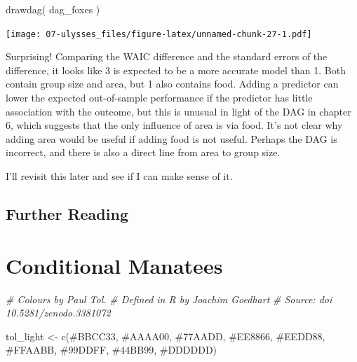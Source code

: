 \documentclass[
]{book}
\newenvironment{Shaded}{\begin{snugshade}}{\end{snugshade}}
\newcommand{\CommentTok}[1]{\textcolor[rgb]{0.56,0.35,0.01}{\textit{#1}}}
\newcommand{\FunctionTok}[1]{\textcolor[rgb]{0.00,0.00,0.00}{#1}}
\newcommand{\NormalTok}[1]{#1}
\newcommand{\OtherTok}[1]{\textcolor[rgb]{0.56,0.35,0.01}{#1}}
\newcommand{\StringTok}[1]{\textcolor[rgb]{0.31,0.60,0.02}{#1}}
\begin{document}
\begin{Shaded}
\begin{Highlighting}[]
\FunctionTok{drawdag}\NormalTok{( dag\_foxes )}
\end{Highlighting}
\end{Shaded}

\texttt{[image: 07-ulysses\_files/figure-latex/unnamed-chunk-27-1.pdf]}

Surprising! Comparing the WAIC difference and the standard errors of the difference, it looks like 3 is expected to be a more accurate model than 1. Both contain group size and area, but 1 also contains food. Adding a predictor can lower the expected out-of-sample performance if the predictor has little association with the outcome, but this is unusual in light of the DAG in chapter 6, which suggests that the only influence of area is via food. It's not clear why adding area would be useful if adding food is not useful. Perhaps the DAG is incorrect, and there is also a direct line from area to group size.

I'll revisit this later and see if I can make sense of it.

\hypertarget{further-reading-6}{%
\section*{Further Reading}\label{further-reading-6}}

\hypertarget{conditional}{%
\chapter{Conditional Manatees}\label{conditional}}

\begin{Shaded}
\begin{Highlighting}[]
\CommentTok{\# Colours by Paul Tol.}
\CommentTok{\# Defined in R by Joachim Goedhart }
\CommentTok{\# Source: doi 10.5281/zenodo.3381072}

\NormalTok{tol\_light }\OtherTok{\textless{}{-}} \FunctionTok{c}\NormalTok{(}\StringTok{\textquotesingle{}\#BBCC33\textquotesingle{}}\NormalTok{, }\StringTok{\textquotesingle{}\#AAAA00\textquotesingle{}}\NormalTok{, }\StringTok{\textquotesingle{}\#77AADD\textquotesingle{}}\NormalTok{, }\StringTok{\textquotesingle{}\#EE8866\textquotesingle{}}\NormalTok{, }\StringTok{\textquotesingle{}\#EEDD88\textquotesingle{}}\NormalTok{, }\StringTok{\textquotesingle{}\#FFAABB\textquotesingle{}}\NormalTok{, }\StringTok{\textquotesingle{}\#99DDFF\textquotesingle{}}\NormalTok{, }\StringTok{\textquotesingle{}\#44BB99\textquotesingle{}}\NormalTok{, }\StringTok{\textquotesingle{}\#DDDDDD\textquotesingle{}}\NormalTok{)}
\end{Highlighting}
\end{Shaded}
\end{document}
